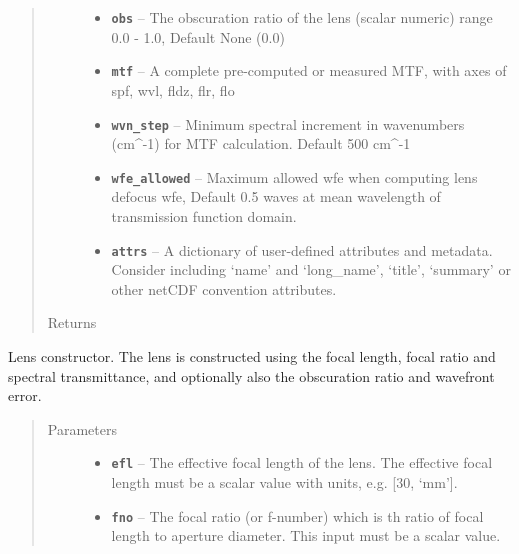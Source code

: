 \documentclass[a4paper,10pt,english]{sphinxmanual}
\begin{document}
\begin{fulllineitems}
\begin{quote}
\begin{description}
\begin{itemize}
\item {} 
\textbf{\texttt{obs}} -- The obscuration ratio of the lens (scalar numeric) range 0.0 - 1.0, Default None (0.0)

\item {} 
\textbf{\texttt{mtf}} -- A complete pre-computed or measured MTF, with axes of spf, wvl, fldz, flr, flo

\item {} 
\textbf{\texttt{wvn\_step}} -- Minimum spectral increment in wavenumbers (cm\textasciicircum{}-1) for MTF calculation. Default 500 cm\textasciicircum{}-1

\item {} 
\textbf{\texttt{wfe\_allowed}} -- Maximum allowed wfe when computing lens defocus wfe, Default 0.5 waves at mean wavelength
of transmission function domain.

\item {} 
\textbf{\texttt{attrs}} -- A dictionary of user-defined attributes and metadata. Consider including `name' and
`long\_name', `title', `summary' or other netCDF convention attributes.

\end{itemize}

\item[{Returns}] \leavevmode


\end{description}\end{quote}

\begin{fulllineitems}
\label{packages:optics.Lens.__init__}
Lens constructor.
The lens is constructed using the focal length, focal ratio and spectral transmittance, and
optionally also the obscuration ratio and wavefront error.
\begin{quote}\begin{description}
\item[{Parameters}] \leavevmode\begin{itemize}
\item {} 
\textbf{\texttt{efl}} -- The effective focal length of the lens. The effective focal length must be a scalar value
with units, e.g. {[}30, `mm'{]}.

\item {} 
\textbf{\texttt{fno}} -- The focal ratio (or f-number) which is th ratio of focal length to aperture diameter. This input
must be a scalar value.


\end{itemize}
\end{description}
\end{quote}
\end{fulllineitems}
\end{fulllineitems}
\end{document}
